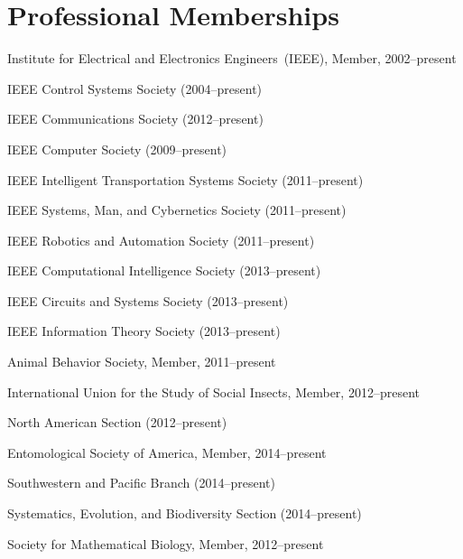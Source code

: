 \section{Professional Memberships}

Institute for Electrical and Electronics Engineers~(IEEE), Member,
2002--present
%
\begin{innerlist}
\item IEEE Control Systems Society (2004--present)
\item IEEE Communications Society (2012--present)
\item IEEE Computer Society (2009--present)
\item IEEE Intelligent Transportation Systems Society (2011--present)
\item IEEE Systems, Man, and Cybernetics Society (2011--present)
\item IEEE Robotics and Automation Society (2011--present)
\item IEEE Computational Intelligence Society (2013--present)
\item IEEE Circuits and Systems Society (2013--present)
\item IEEE Information Theory Society (2013--present)
\end{innerlist}

\halfblankline

Animal Behavior Society, Member, 2011--present

\halfblankline

International Union for the Study of Social Insects, Member, 2012--present
\begin{innerlist}
\item North American Section (2012--present)
\end{innerlist}

\halfblankline

Entomological Society of America, Member, 2014--present
\begin{innerlist}
\item Southwestern and Pacific Branch (2014--present)
\item Systematics, Evolution, and Biodiversity Section (2014--present)
\end{innerlist}

\halfblankline

Society for Mathematical Biology, Member, 2012--present